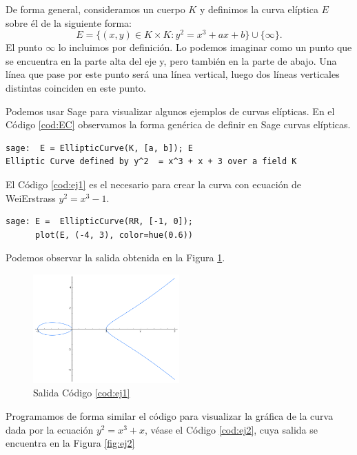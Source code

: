 \documentclass[11pt]{article}
\begin{document}
De forma general, consideramos un cuerpo $K$ y definimos la curva elíptica $E$ sobre él de la siguiente forma:
\[E = \{(x,y) \in K\times K : y^2 = x^3 + ax +b\} \cup \{\infty\}.
\]
El punto $\infty$ lo incluimos por definición. Lo podemos imaginar como un punto que se encuentra en la parte alta del eje y, pero también en la parte de abajo. Una línea que pase por este punto será una línea vertical, luego dos líneas verticales distintas coinciden en este punto.

Podemos usar Sage para visualizar algunos ejemplos de curvas elípticas. En el Código \ref{cod:EC} observamos la forma genérica de definir en Sage curvas elípticas.

\begin{lstlisting}[label={cod:EC}, caption={Curva elíptica en Sage}, morekeywords={sage}]
sage:  E = EllipticCurve(K, [a, b]); E
Elliptic Curve defined by y^2  = x^3 + x + 3 over a field K
\end{lstlisting}

El Código \ref{cod:ej1} es el necesario para crear la curva con ecuación de WeiErstrass $y^2=x^3-1$.

\begin{lstlisting}[label={cod:ej1}, caption={Curva elíptica $y^2=x^3-x$}, morekeywords={sage}]
sage: E =  EllipticCurve(RR, [-1, 0]);
      plot(E, (-4, 3), color=hue(0.6))
\end{lstlisting}

Podemos observar la salida obtenida en la Figura \ref{fig:ej1}.

\begin{figure}[H]
    \centering
    \includegraphics[width=0.5\textwidth]{ej1}
    \caption{Salida Código \ref{cod:ej1}}
    \label{fig:ej1}
\end{figure}

Programamos de forma similar el código para visualizar la gráfica de la curva dada por la ecuación $y^2=x^3+x$, véase el Código \ref{cod:ej2}, cuya salida se encuentra en la Figura \ref{fig:ej2}
\end{document}
